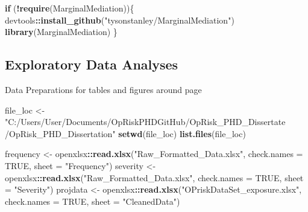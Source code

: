 \documentclass[]{DissertateUSU}
\newenvironment{Shaded}{\begin{snugshade}}{\end{snugshade}}
\newcommand{\KeywordTok}[1]{\textcolor[rgb]{0.13,0.29,0.53}{\textbf{#1}}}
\newcommand{\DataTypeTok}[1]{\textcolor[rgb]{0.13,0.29,0.53}{#1}}
\newcommand{\StringTok}[1]{\textcolor[rgb]{0.31,0.60,0.02}{#1}}
\newcommand{\OtherTok}[1]{\textcolor[rgb]{0.56,0.35,0.01}{#1}}
\newcommand{\ControlFlowTok}[1]{\textcolor[rgb]{0.13,0.29,0.53}{\textbf{#1}}}
\newcommand{\OperatorTok}[1]{\textcolor[rgb]{0.81,0.36,0.00}{\textbf{#1}}}
\newcommand{\NormalTok}[1]{#1}
\begin{document}
\begin{Shaded}
\begin{Highlighting}[]
\ControlFlowTok{if}\NormalTok{ (}\OperatorTok{!}\KeywordTok{require}\NormalTok{(MarginalMediation))\{}
\NormalTok{  devtools}\OperatorTok{::}\KeywordTok{install_github}\NormalTok{(}\StringTok{"tysonstanley/MarginalMediation"}\NormalTok{)}
  \KeywordTok{library}\NormalTok{(MarginalMediation)}
\NormalTok{\}}
\end{Highlighting}
\end{Shaded}

\normalsize

\clearpage

\subsection*{Exploratory Data Analyses}\label{exploratory-data-analyses}

Data Preparations for tables and figures around page

\small

\begin{Shaded}
\begin{Highlighting}[]
\NormalTok{file_loc <-}\StringTok{ "C:/Users/User/Documents/OpRiskPHDGitHub/OpRisk_PHD_Dissertate}
\StringTok{/OpRisk_PHD_Dissertation"}
\KeywordTok{setwd}\NormalTok{(file_loc)}
\KeywordTok{list.files}\NormalTok{(file_loc)}

\NormalTok{frequency <-}\StringTok{ }\NormalTok{openxlsx}\OperatorTok{::}\KeywordTok{read.xlsx}\NormalTok{(}\StringTok{"Raw_Formatted_Data.xlsx"}\NormalTok{, }
                                 \DataTypeTok{check.names =} \OtherTok{TRUE}\NormalTok{, }\DataTypeTok{sheet =} \StringTok{"Frequency"}\NormalTok{)}
\NormalTok{severity <-}\StringTok{ }\NormalTok{openxlsx}\OperatorTok{::}\KeywordTok{read.xlsx}\NormalTok{(}\StringTok{"Raw_Formatted_Data.xlsx"}\NormalTok{, }
                                \DataTypeTok{check.names =} \OtherTok{TRUE}\NormalTok{, }\DataTypeTok{sheet =} \StringTok{"Severity"}\NormalTok{)}
\NormalTok{projdata <-}\StringTok{ }\NormalTok{openxlsx}\OperatorTok{::}\KeywordTok{read.xlsx}\NormalTok{(}\StringTok{"OPriskDataSet_exposure.xlsx"}\NormalTok{, }
                                \DataTypeTok{check.names =} \OtherTok{TRUE}\NormalTok{, }\DataTypeTok{sheet =} \StringTok{"CleanedData"}\NormalTok{)}
\end{Highlighting}
\end{Shaded}
\end{document}
